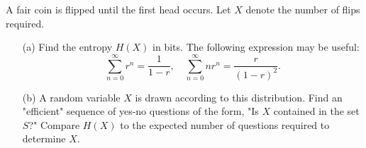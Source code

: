 \documentclass{assignment}
\begin{document}
\begin{prob}
    A fair coin is flipped until the first head occurs. Let $X$ denote the number of flips required.
    \begin{itemize}
        \item[(a)] Find the entropy $H(X)$ in bits. The following expression may be useful:
        \[
            \sum_{n=0}^{\infty}r^n=\frac{1}{1-r},\quad\sum_{n=0}^{\infty}nr^n=\frac{r}{(1-r)^2}.
        \]
        \item[(b)] A random variable $X$ is drawn according to this distribution. Find an "efficient" sequence of yes-no questions of the form, "Is $X$ contained in the set $S$?" Compare $H(X)$ to the expected number of questions required to determine $X$.
    \end{itemize}
\end{prob}
\end{document}
